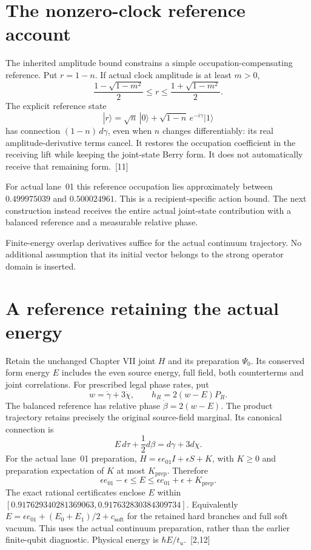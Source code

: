\documentclass[10pt,twocolumn,letterpaper]{article}
\begin{document}
\section{The nonzero-clock reference account}
The inherited amplitude bound constrains a simple occupation-compensating reference. Put $r=1-n$. If actual clock amplitude is at least $m>0$,
\[
\frac{1-\sqrt{1-m^2}}2\leq r\leq\frac{1+\sqrt{1-m^2}}2.
\]
The explicit reference state
\[
|r\rangle=\sqrt n\,|0\rangle+\sqrt{1-n}\,e^{-i\gamma}|1\rangle
\]
has connection $(1-n)\,d\gamma$, even when $n$ changes differentiably: its real amplitude-derivative terms cancel. It restores the occupation coefficient in the receiving lift while keeping the joint-state Berry form. It does not automatically receive that remaining form.~[11]

For actual lane~01 this reference occupation lies approximately between $0.499975039$ and $0.500024961$. This is a recipient-specific action bound. The next construction instead receives the entire actual joint-state contribution with a balanced reference and a measurable relative phase.

Finite-energy overlap derivatives suffice for the actual continuum trajectory. No additional assumption that its initial vector belongs to the strong operator domain is inserted.

\section{A reference retaining the actual energy}
Retain the unchanged Chapter VII joint $H$ and its preparation $\Psi_0$. Its conserved form energy $E$ includes the even source energy, full field, both counterterms and joint correlations. For prescribed legal phase rates, put
\[
w=\dot\gamma+3\dot\chi,\qquad h_R=2(w-E)P_R.
\]
The balanced reference has relative phase $\dot\beta=2(w-E)$. The product trajectory retains precisely the original source-field marginal. Its canonical connection is
\[
E\,d\tau+\frac12d\beta=d\gamma+3d\chi.
\]
For the actual lane~01 preparation, $H=\epsilon e_{01}I+\epsilon S+K$, with $K\geq0$ and preparation expectation of $K$ at most $K_{\mathrm{prep}}$. Therefore
\[
\epsilon e_{01}-\epsilon\leq E\leq\epsilon e_{01}+\epsilon+K_{\mathrm{prep}}.
\]
The exact rational certificates enclose $E$ within $[0.917629340281369063,\allowbreak 0.917632830384309734]$. Equivalently $E=\epsilon e_{01}+(E_0+E_1)/2+c_{\mathrm{soft}}$ for the retained hard branches and full soft vacuum. This uses the actual continuum preparation, rather than the earlier finite-qubit diagnostic. Physical energy is $\hbar E/t_u$.~[2,12]
\end{document}
